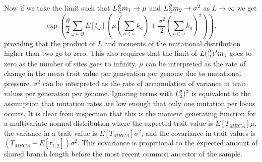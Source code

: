 Now if we take the limit such that $L\frac{\theta}{2} m_1 \to \mu$ and $L\frac{\theta}{2} m_2\to \sigma^2$
as $L \to \infty$ we get
\begin{equation}
  \exp \left( \frac{\theta}{2} \sum_{\omega \in \mathcal{O}}E[t_{\omega}] \left( \mu \left(
  \sum_{a \in \omega} k_a\right) + \frac{\sigma^2}{2}\left( \sum_{a \in \omega}
  k_a\right)^2\right)\right),
\end{equation}
providing that the product of $L$ and moments of the mutational distribution
higher than two go to zero. This also requires that the limit of $L(\frac{\theta}{2})^2m_1$
goes to zero as the number of sites goes to infinity. $\mu$ can be interpreted
as the rate of change in the mean trait value per generation per genome due to
mutational pressure. $\sigma^2$ can be interpreted as the rate of accumulation
of variance in trait values per generation per genome. Ignoring terms with
$(\frac{\theta}{2})^2$ is equivalent to the assumption that mutation rates are low enough that
only one mutation per locus occurs. It is clear from inspection that this is the
moment generating function for a multivariate normal distribution where the
expected trait value is $E[T_{MRCA}] \mu$, the variance in a trait value is
$E[T_{MRCA}]\sigma^2$, and the covariance in trait values is
$(T_{MRCA}-E[\tau_{1,2}]) \sigma^2$. This covariance is proprtional to the
expected amount of shared branch length before the most recent common ancestor
of the sample.

